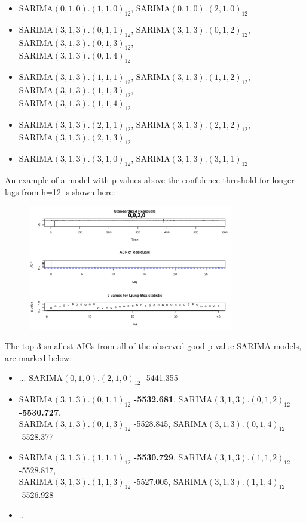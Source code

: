 \documentclass[a4paper,11pt]{article}
\begin{document}
    \begin{itemize}
        \item $\text{SARIMA}(0,1,0).(1,1,0)_{12}$, $\text{SARIMA}(0,1,0).(2,1,0)_{12}$
        \item $\text{SARIMA}(3,1,3).(0,1,1)_{12}$, $\text{SARIMA}(3,1,3).(0,1,2)_{12}$, $\text{SARIMA}(3,1,3).(0,1,3)_{12}$, \\ $\text{SARIMA}(3,1,3).(0,1,4)_{12}$
        \item $\text{SARIMA}(3,1,3).(1,1,1)_{12}$, $\text{SARIMA}(3,1,3).(1,1,2)_{12}$, $\text{SARIMA}(3,1,3).(1,1,3)_{12}$, \\ $\text{SARIMA}(3,1,3).(1,1,4)_{12}$
        \item $\text{SARIMA}(3,1,3).(2,1,1)_{12}$, $\text{SARIMA}(3,1,3).(2,1,2)_{12}$, $\text{SARIMA}(3,1,3).(2,1,3)_{12}$
        \item $\text{SARIMA}(3,1,3).(3,1,0)_{12}$, $\text{SARIMA}(3,1,3).(3,1,1)_{12}$
    \end{itemize}

    An example of a model with p-values above the confidence threshold for longer lags from h=12 is shown here:

    \begin{figure}[H]
        \centering
        \includegraphics[width=0.8\textwidth]{figure-markdown_strict/0-0-2-0.png}
        \label{fig:f7}
    \end{figure}

    The top-3 smallest AICs from all of the observed good p-value SARIMA models, are marked below:

    \begin{itemize}
        \item ... $\text{SARIMA}(0,1,0).(2,1,0)_{12}$ -5441.355
        \item $\text{SARIMA}(3,1,3).(0,1,1)_{12}$ \textbf{-5532.681}, $\text{SARIMA}(3,1,3).(0,1,2)_{12}$ \textbf{-5530.727}, \\ $\text{SARIMA}(3,1,3).(0,1,3)_{12}$ -5528.845, $\text{SARIMA}(3,1,3).(0,1,4)_{12}$ -5528.377
        \item $\text{SARIMA}(3,1,3).(1,1,1)_{12}$ \textbf{-5530.729}, $\text{SARIMA}(3,1,3).(1,1,2)_{12}$ -5528.817, \\ $\text{SARIMA}(3,1,3).(1,1,3)_{12}$ -5527.005, $\text{SARIMA}(3,1,3).(1,1,4)_{12}$ -5526.928
        \item ...
    \end{itemize}
\end{document}
